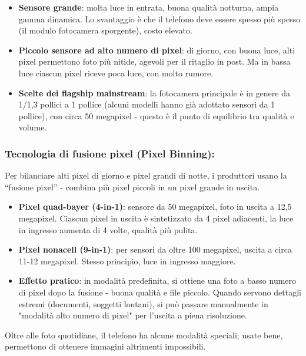 \begin{itemize}
  \item \textbf{Sensore grande}: molta luce in entrata, buona qualità notturna, ampia gamma dinamica. Lo svantaggio è che il telefono deve essere spesso più spesso (il modulo fotocamera sporgente), costo elevato.
  \item \textbf{Piccolo sensore ad alto numero di pixel}: di giorno, con buona luce, alti pixel permettono foto più nitide, agevoli per il ritaglio in post. Ma in bassa luce ciascun pixel riceve poca luce, con molto rumore.
  \item \textbf{Scelte dei flagship mainstream}: la fotocamera principale è in genere da 1/1,3 pollici a 1 pollice (alcuni modelli hanno già adottato sensori da 1 pollice), con circa 50 megapixel - questo è il punto di equilibrio tra qualità e volume.
\end{itemize}

\subsubsection*{Tecnologia di fusione pixel (Pixel Binning):}

Per bilanciare alti pixel di giorno e pixel grandi di notte, i produttori usano la “fusione pixel” - combina più pixel piccoli in un pixel grande in uscita.

\begin{itemize}
  \item \textbf{Pixel quad-bayer (4-in-1)}: sensore da 50 megapixel, foto in uscita a 12,5 megapixel. Ciascun pixel in uscita è sintetizzato da 4 pixel adiacenti, la luce in ingresso aumenta di 4 volte, qualità più pulita.
  \item \textbf{Pixel nonacell (9-in-1)}: per sensori da oltre 100 megapixel, uscita a circa 11-12 megapixel. Stesso principio, luce in ingresso maggiore.
  \item \textbf{Effetto pratico}: in modalità predefinita, si ottiene una foto a basso numero di pixel dopo la fusione - buona qualità e file piccolo. Quando servono dettagli estremi (documenti, soggetti lontani), si può passare manualmente in "modalità alto numero di pixel" per l'uscita a piena risoluzione.
\end{itemize}


Oltre alle foto quotidiane, il telefono ha alcune modalità speciali; usate bene, permettono di ottenere immagini altrimenti impossibili.

